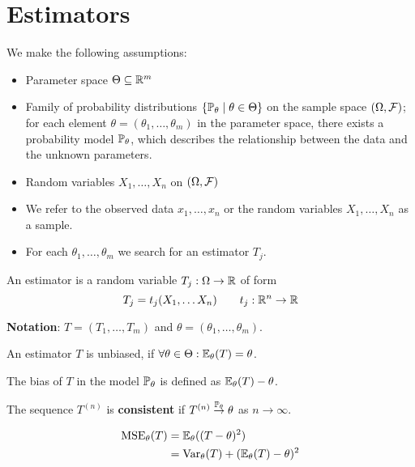 \section{Estimators}
We make the following assumptions:
\begin{itemize}
  \item Parameter space \(\Theta \subseteq \R^m\)
  \item Family of probability distributions \(\{\P_\theta \mid \theta \in \Theta\}\) on the sample space \((\O, \F)\); for each element \(\theta = (\theta_1, \ldots, \theta_m)\) in the parameter space, there exists a probability model \(\P_\theta\), which describes the relationship between the data and the unknown parameters.
  \item Random variables \(X_1, \ldots, X_n\) on \((\O, \mathcal{F})\)
  \item We refer to the observed data \(x_1, \ldots, x_n\) or the random variables \(X_1, \ldots, X_n\) as a sample.
  \item For each \(\theta_1, \ldots, \theta_m\) we search for an estimator \(T_j\).
\end{itemize}

\begin{definition*}[Estimator]
  An estimator is a random variable \(T_j: \O \to \R\) of form
  \[T_j = t_j(X_1, \ldots X_n) \qquad t_j: \R^n \to \R\]
\end{definition*}

\textbf{Notation}: \(T = (T_1, \ldots, T_m)\) and \(\theta = (\theta_1, \ldots, \theta_m)\).

\begin{definition*}[Unbiased]
  An estimator \(T\) is unbiased, if \(\forall \theta \in \Theta: \E_\theta(T) = \theta\).
\end{definition*}

\begin{definition*}[Bias]
  The bias of \(T\) in the model \(\P_\theta\) is defined as \(\E_\theta(T) - \theta\).
\end{definition*}

\begin{definition*}[Consistent]
  The sequence \(T^{(n)}\) is \textbf{consistent} if \(T^{(n)} \stackrel{\P_\theta}{\to}\theta\) as \(n \to \infty\).
\end{definition*}

\begin{definition*}
  \vspace{-13pt}
  \begin{align*}
    \MSE_\theta(T) &= \E_\theta((T-\theta)^2) \\
    &= \Var_\theta(T) + (\E_\theta(T) - \theta)^2
  \end{align*}
\end{definition*}


